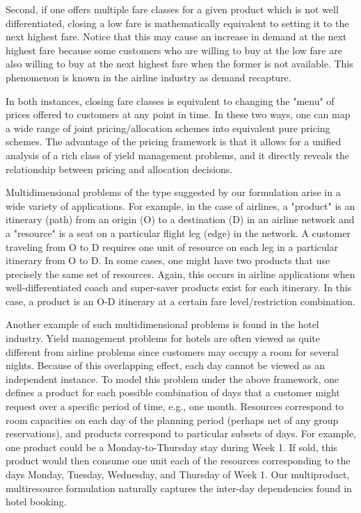 Second, if one offers multiple fare classes for a given product which is not well differentiated, closing a low fare is mathematically equivalent to setting it to the next highest fare. Notice that this may cause an increase in demand at the next highest fare because some customers who are willing to buy at the low fare are also willing to buy at the next highest fare when the former is not available. This phenomenon is known in the airline industry as demand recapture.

In both instances, closing fare classes is equivalent to changing the "menu" of prices offered to customers at any point in time. In these two ways, one can map a wide range of joint pricing/allocation schemes into equivalent pure pricing schemes. The advantage of the pricing framework is that it allows for a unified analysis of a rich class of yield management problems, and it directly reveals the relationship between pricing and allocation decisions.

Multidimensional problems of the type suggested by our formulation arise in a wide variety of applications. For example, in the case of airlines, a "product" is an itinerary (path) from an origin (O) to a destination (D) in an airline network and a "resource" is a seat on a particular flight leg (edge) in the network. A customer traveling from O to D requires one unit of resource on each leg in a particular itinerary from O to D. In some cases, one might have two products that use precisely the same set of resources. Again, this occurs in airline applications when well-differentiated coach and super-saver products exist for each itinerary. In this case, a product is an O-D itinerary at a certain fare level/restriction combination.

Another example of such multidimensional problems is found in the hotel industry. Yield management problems for hotels are often viewed as quite different from airline problems since customers may occupy a room for several nights. Because of this overlapping effect, each day cannot be viewed as an independent instance. To model this problem under the above framework, one defines a product for each possible combination of days that a customer might request over a specific period of time, e.g., one month. Resources correspond to room capacities on each day of the planning period (perhaps net of any group reservations), and products correspond to particular subsets of days. For example, one product could be a Monday-to-Thursday stay during Week 1. If sold, this product would then consume one unit each of the resources corresponding to the days Monday, Tuesday, Wednesday, and Thursday of Week 1. Our multiproduct, multiresource formulation naturally captures the inter-day dependencies found in hotel booking.

